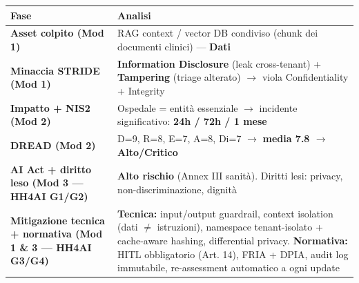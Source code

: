 \documentclass[11pt, a4paper]{article}
\begin{document}
\noindent
\begin{tabularx}{\textwidth}{|>{\bfseries}l|X|}
\hline
Fase & \textbf{Analisi} \\ \hline
Asset colpito (Mod 1) & RAG context / vector DB condiviso (chunk dei documenti clinici) — \textbf{Dati} \\ \hline
Minaccia STRIDE (Mod 1) & \textbf{Information Disclosure} (leak cross-tenant) + \textbf{Tampering} (triage alterato) $\rightarrow$ viola Confidentiality + Integrity \\ \hline
Impatto + NIS2 (Mod 2) & Ospedale = entità essenziale $\rightarrow$ incidente significativo: \textbf{24h / 72h / 1 mese} \\ \hline
DREAD (Mod 2) & D=9, R=8, E=7, A=8, Di=7 $\rightarrow$ \textbf{media 7.8 $\rightarrow$ Alto/Critico} \\ \hline
AI Act + diritto leso (Mod 3 — HH4AI G1/G2) & \textbf{Alto rischio} (Annex III sanità). Diritti lesi: privacy, non-discriminazione, dignità \\ \hline
Mitigazione tecnica + normativa (Mod 1 \& 3 — HH4AI G3/G4) & \textbf{Tecnica:} input/output guardrail, context isolation (dati $\neq$ istruzioni), namespace tenant-isolato + cache-aware hashing, differential privacy. \textbf{Normativa:} HITL obbligatorio (Art. 14), FRIA + DPIA, audit log immutabile, re-assessment automatico a ogni update \\ \hline
\end{tabularx}
\end{document}
